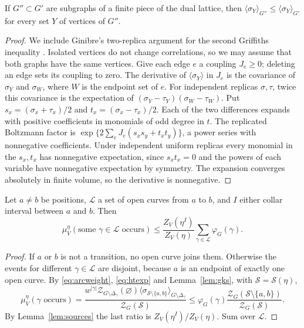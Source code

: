 \begin{lemma}\label{lem:gks}
If $G''\subset G'$ are subgraphs of a finite piece of the dual lattice, then $\langle\sigma_Y\rangle_{G''}\le\langle\sigma_Y\rangle_{G'}$ for every set $Y$ of vertices of $G''$.
\end{lemma}
\begin{proof}
We include Ginibre's two-replica argument \cite{Ginibre70} for the second Griffiths inequality \cite{Griffiths67,KellySherman68}. Isolated vertices do not change correlations, so we may assume that both graphs have the same vertices. Give each edge $e$ a coupling $J_e\ge0$; deleting an edge sets its coupling to zero. The derivative of $\langle\sigma_Y\rangle$ in $J_e$ is the covariance of $\sigma_Y$ and $\sigma_W$, where $W$ is the endpoint set of $e$. For independent replicas $\sigma,\tau$, twice this covariance is the expectation of $(\sigma_Y-\tau_Y)(\sigma_W-\tau_W)$. Put $s_x=(\sigma_x+\tau_x)/2$ and $t_x=(\sigma_x-\tau_x)/2$. Each of the two differences expands with positive coefficients in monomials of odd degree in $t$. The replicated Boltzmann factor is $\exp\{2\sum_eJ_e(s_xs_y+t_xt_y)\}$, a power series with nonnegative coefficients. Under independent uniform replicas every monomial in the $s_x,t_x$ has nonnegative expectation, since $s_xt_x=0$ and the powers of each variable have nonnegative expectation by symmetry. The expansion converges absolutely in finite volume, so the derivative is nonnegative.
\end{proof}

\begin{lemma}\label{lem:arcratio}
Let $a\ne b$ be positions, $\mathcal L$ a set of open curves from $a$ to $b$, and $I$ either collar interval between $a$ and $b$. Then
\begin{equation}\label{eq:arcratio}
 \mu_V^\eta(\text{some }\gamma\in\mathcal L\text{ occurs})
 \le\frac{Z_V(\eta^I)}{Z_V(\eta)}\sum_{\gamma\in\mathcal L}\varphi_G(\gamma).
\end{equation}
\end{lemma}
\begin{proof}
If $a$ or $b$ is not a transition, no open curve joins them. Otherwise the events for different $\gamma\in\mathcal L$ are disjoint, because $a$ is an endpoint of exactly one open curve. By \eqref{eq:arcweight}, \eqref{eq:htexp} and Lemma~\ref{lem:gks}, with $\mathcal S=\mathcal S(\eta)$,
\[
 \mu_V^\eta(\gamma\text{ occurs})
 =\frac{w^{|\gamma|}\mathcal Z_{G\setminus\Delta_\gamma}(\varnothing)\langle\sigma_{\mathcal S\setminus\{a,b\}}\rangle_{G\setminus\Delta_\gamma}}{\mathcal Z_G(\mathcal S)}
 \le\varphi_G(\gamma)\frac{\mathcal Z_G(\mathcal S\setminus\{a,b\})}{\mathcal Z_G(\mathcal S)}.
\]
By Lemma~\ref{lem:sources} the last ratio is $Z_V(\eta^I)/Z_V(\eta)$. Sum over $\mathcal L$.
\end{proof}

